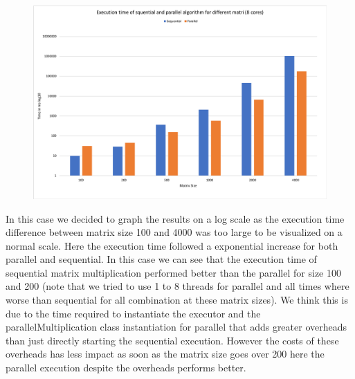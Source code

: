 \documentclass[11pt,letterpaper]{exam}
\begin{document}
\begin{questions}
			\begin{figure}[h!]
				\centering
				\includegraphics[scale=0.5]{ExectionParallelSequential}
			\end{figure}
			In this case we decided to graph the results on a log scale as the execution time difference between matrix size 100 and 4000 was too large to be visualized on a normal scale. Here the execution time followed a exponential increase for both parallel and sequential. In this case we can see that the execution time of sequential matrix multiplication performed better than the parallel for size 100 and 200 (note that we tried to use 1 to 8 threads for parallel and all times where worse than sequential for all combination at these matrix sizes). We think this is due to the time required to instantiate the executor and the parallelMultiplication class instantiation for parallel that adds greater overheads than just directly starting the sequential execution. However the costs of these overheads has less impact as soon as the matrix size goes over 200 here the parallel execution despite the overheads performs better.
		\question
\end{questions}
\end{document}
